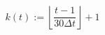 \begin{equation}
	k(t) := \left\lfloor\frac{t-1}{30\Delta t}\right\rfloor+1
	\label{ch2:equ:sample-conversion-function}
\end{equation}